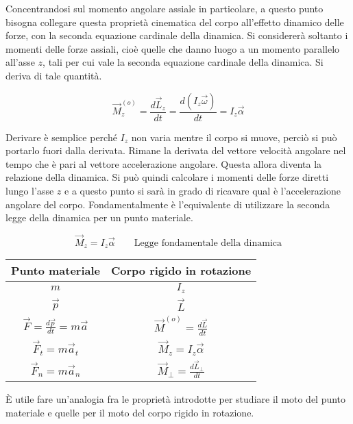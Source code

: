 Concentrandosi sul momento angolare assiale in particolare, a questo punto bisogna collegare questa proprietà cinematica del corpo all'effetto dinamico delle forze, con la seconda equazione cardinale della dinamica. Si considererà soltanto i momenti delle forze assiali, cioè quelle che danno luogo a un momento parallelo all'asse $z$, tali per cui vale la seconda equazione cardinale della dinamica. Si deriva di tale quantità.

\[
	\vec{M}^{(o)}_z = \frac{d\vec{L}_z }{dt} = \frac{d(I_z\vec{\omega}) }{dt} = I_z \vec{\alpha}
\]

Derivare è semplice perché $I_z$ non varia mentre il corpo si muove, perciò si può portarlo fuori dalla derivata. Rimane la derivata del vettore velocità angolare nel tempo che è pari al vettore accelerazione angolare. Questa allora diventa la relazione della dinamica. Si può quindi calcolare i momenti delle forze diretti lungo l'asse $z$ e a questo punto si sarà in grado di ricavare qual è l'accelerazione angolare del corpo. Fondamentalmente è l'equivalente di utilizzare la seconda legge della dinamica per un punto materiale.

\[
	\boxed{\vec{M}_z = I_z\vec{\alpha}} \qquad \text{Legge fondamentale della dinamica}
\]

\begin{table}[H]
		\centering
		\begin{tabular}{c|c}
			Punto materiale & Corpo rigido in rotazione \\
			\hline
			$m$ & $I_z$ \\
			$\vec{p}$ & $\vec{L}$ \\
			$\vec{F} = \frac{d\vec{p} }{dt} = m\vec{a}$ & $\vec{M}^{(o)} = \frac{d\vec{L} }{dt}$ \\
			$\vec{F}_t = m\vec{a}_t$ & $\vec{M}_z=I_z\vec{\alpha}$ \\
			$\vec{F}_n = m\vec{a}_n$ & $\vec{M}_{\bot} = \frac{d\vec{L}_{\bot} }{dt}$
		\end{tabular}
	\end{table}
È utile fare un'analogia fra le proprietà introdotte per studiare il moto del punto materiale e quelle per il moto del corpo rigido in rotazione.

